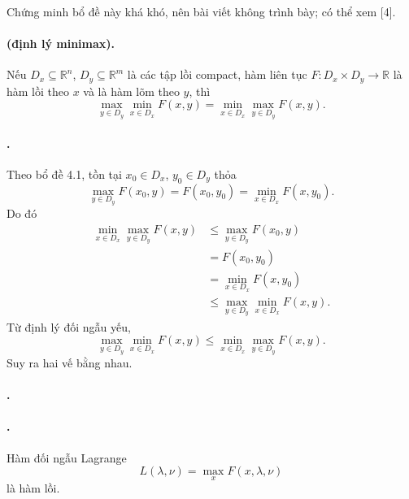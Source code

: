 \documentclass[11pt]{article}
\begin{document}
Chứng minh bổ đề này khá khó, nên bài viết không trình bày; có thể xem [4].

\paragraph{ (định lý minimax).}
Nếu \(D_x\subseteq\mathbb R^n\), \(D_y\subseteq\mathbb R^m\) là các tập lồi
compact, hàm liên tục \(F:D_x\times D_y\to\mathbb R\) là hàm lồi theo \(x\) và
là hàm lõm theo \(y\), thì
\[
  \max_{y\in D_y}\min_{x\in D_x}F(x,y)
  =
  \min_{x\in D_x}\max_{y\in D_y}F(x,y).
\]

\paragraph{.}
Theo bổ đề 4.1, tồn tại \(x_0\in D_x\), \(y_0\in D_y\) thỏa
\[
  \max_{y\in D_y}F(x_0,y)=F(x_0,y_0)=\min_{x\in D_x}F(x,y_0).
\]
Do đó
\[
\begin{aligned}
  \min_{x\in D_x}\max_{y\in D_y}F(x,y)
  &\le \max_{y\in D_y}F(x_0,y)\\
  &=F(x_0,y_0)\\
  &=\min_{x\in D_x}F(x,y_0)\\
  &\le \max_{y\in D_y}\min_{x\in D_x}F(x,y).
\end{aligned}
\]
Từ định lý đối ngẫu yếu,
\[
  \max_{y\in D_y}\min_{x\in D_x}F(x,y)
  \le
  \min_{x\in D_x}\max_{y\in D_y}F(x,y).
\]
Suy ra hai vế bằng nhau.

\paragraph{.}
\paragraph{.}
Hàm đối ngẫu Lagrange
\[
  L(\lambda,\nu)=\max_x F(x,\lambda,\nu)
\]
là hàm lồi.
\end{document}
